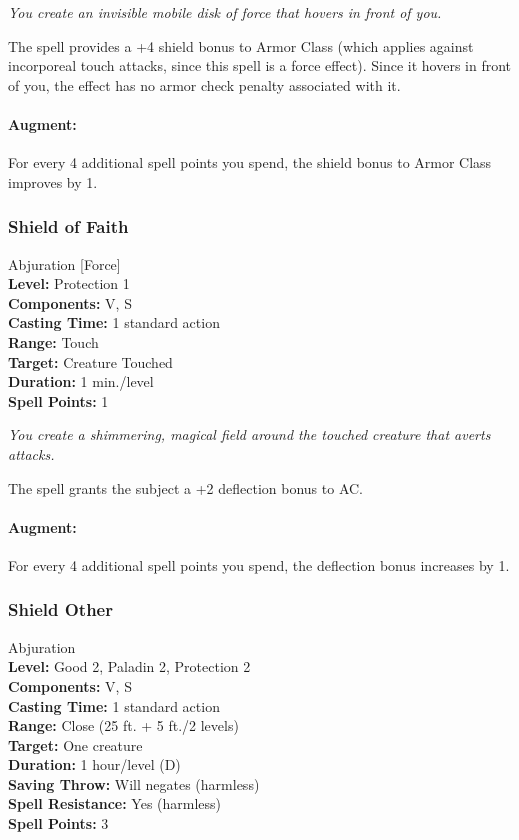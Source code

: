 \emph{You create an invisible mobile disk of force that hovers in front of you. }

The spell provides a +4 shield bonus to Armor Class (which applies against incorporeal touch attacks, since this spell is a force effect). 
Since it hovers in front of you, the effect has no armor check penalty associated with it.

\paragraph{Augment:} For every 4 additional spell points you spend, the shield bonus to Armor Class improves by 1.
\subsubsection{Shield of Faith}
\label{Spell:ShieldOfFaith}
Abjuration [Force]
\\ \textbf{Level:} Protection 1
\\ \textbf{Components:} V, S
\\ \textbf{Casting Time:} 1 standard action
\\ \textbf{Range:} Touch
\\ \textbf{Target:} Creature Touched
\\ \textbf{Duration:} 1 min./level
\\ \textbf{Spell Points:} 1

\emph{You create a shimmering, magical field around the touched creature that averts attacks.}

The spell grants the subject a +2 deflection bonus to AC.

\paragraph{Augment:} For every 4 additional spell points you spend, the deflection bonus increases by 1.
\subsubsection{Shield Other}
\label{Spell:ShieldOther}
Abjuration
\\ \textbf{Level:} Good 2, Paladin 2, Protection 2
\\ \textbf{Components:} V, S
\\ \textbf{Casting Time:} 1 standard action
\\ \textbf{Range:} Close (25 ft. + 5 ft./2 levels)
\\ \textbf{Target:} One creature
\\ \textbf{Duration:} 1 hour/level (D)
\\ \textbf{Saving Throw:} Will negates (harmless)
\\ \textbf{Spell Resistance:} Yes (harmless)
\\ \textbf{Spell Points:} 3

